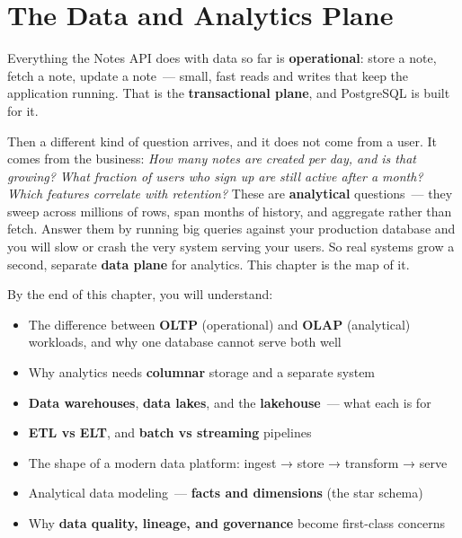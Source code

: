 \setcounter{chapter}{41}
\chapter{The Data and Analytics Plane}\label{ch:42-data-analytics-plane}

\chapterrule

Everything the Notes API does with data so far is \textbf{operational}: store a note, fetch a note, update a note~--- small, fast reads and writes that keep the application running. That is the \textbf{transactional plane}, and PostgreSQL is built for it.

Then a different kind of question arrives, and it does not come from a user. It comes from the business: \emph{How many notes are created per day, and is that growing? What fraction of users who sign up are still active after a month? Which features correlate with retention?} These are \textbf{analytical} questions~--- they sweep across millions of rows, span months of history, and aggregate rather than fetch. Answer them by running big queries against your production database and you will slow or crash the very system serving your users. So real systems grow a second, separate \textbf{data plane} for analytics. This chapter is the map of it.

\begin{objectives}

By the end of this chapter, you will understand:

\begin{itemize}
\tightlist
\item
  The difference between \textbf{OLTP} (operational) and \textbf{OLAP} (analytical) workloads, and why one database cannot serve both well
\item
  Why analytics needs \textbf{columnar} storage and a separate system
\item
  \textbf{Data warehouses}, \textbf{data lakes}, and the \textbf{lakehouse}~--- what each is for
\item
  \textbf{ETL vs ELT}, and \textbf{batch vs streaming} pipelines
\item
  The shape of a modern data platform: ingest → store → transform → serve
\item
  Analytical data modeling~--- \textbf{facts and dimensions} (the star schema)
\item
  Why \textbf{data quality, lineage, and governance} become first-class concerns
\end{itemize}

\end{objectives}

